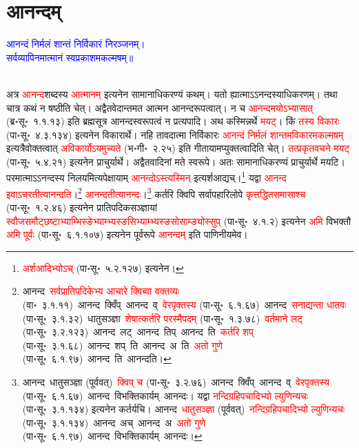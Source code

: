 \section[आनन्दम्]{आनन्दम्}
\centering\textcolor{blue}{आनन्दं निर्मलं शान्तं निर्विकारं निरञ्जनम्।\nopagebreak\\
सर्वव्यापिनमात्मानं स्वप्रकाशमकल्मषम्॥}\nopagebreak\\
\\
\begin{sloppypar}\justifying\noindent\hspace{10mm} अत्र \textcolor{red}{आनन्द}\-शब्दस्य \textcolor{red}{आत्मानम्} इत्यनेन सामानाधिकरण्यं कथम्। यतो ह्यात्माऽऽनन्दस्याधिकरणम्। तथा चात्र कथं न षष्ठीति चेत्। अद्वैत\-वेदान्त\-मत आत्मन आनन्द\-रूपत्वात्। न च \textcolor{red}{आनन्दमयोऽभ्यासात्} (ब्र॰सू॰~१.१.१३) इति ब्रह्मसूत्र आनन्द\-स्वरूपत्वं न प्रत्यपादि। अथ कस्मिन्नर्थे \textcolor{red}{मयट्}। किं \textcolor{red}{तस्य विकारः} (पा॰सू॰~४.३.१३४) इत्यनेन विकारार्थे। नहि तावदात्मा निर्विकारः \textcolor{red}{आनन्दं निर्मलं शान्तमविकारमकल्मषम्} इत्यत्रैवोक्तत्वात् \textcolor{red}{अविकार्योऽयमुच्यते} (भ॰गी॰~२.२५) इति गीतायामप्युक्तत्वादिति चेत्। \textcolor{red}{तत्प्रकृत\-वचने मयट्} (पा॰सू॰~५.४.२१) इत्यनेन प्राचुर्यार्थे। अद्वैतवादिनां मते स्वरूपे। अतः सामानाधिकरण्यं प्राचुर्यार्थे मयटि। परमात्माऽऽनन्दस्य निलयमित्यपेक्षायाम् \textcolor{red}{आनन्दोऽस्त्यस्मिन्} इत्यर्श\-आद्यच्।\footnote{\textcolor{red}{अर्शआदिभ्योऽच्} (पा॰सू॰~५.२.१२७) इत्यनेन।} यद्वा \textcolor{red}{आनन्द इवाऽचरतीत्यानन्दति}।\footnote{आनन्द~\arrow \textcolor{red}{सर्वप्राति\-पदिकेभ्य आचारे क्विब्वा वक्तव्यः} (वा॰~३.१.११)~\arrow आनन्द~क्विँप्~\arrow आनन्द~व्~\arrow \textcolor{red}{वेरपृक्तस्य} (पा॰सू॰~६.१.६७)~\arrow आनन्द~\arrow \textcolor{red}{सनाद्यन्ता धातवः} (पा॰सू॰~३.१.३२)~\arrow धातुसञ्ज्ञा~\arrow \textcolor{red}{शेषात्कर्तरि परस्मैपदम्} (पा॰सू॰~१.३.७८)~\arrow \textcolor{red}{वर्तमाने लट्} (पा॰सू॰~३.२.१२३)~\arrow आनन्द~लट्~\arrow आनन्द~तिप्~\arrow आनन्द~ति~\arrow \textcolor{red}{कर्तरि शप्‌} (पा॰सू॰~३.१.६८)~\arrow आनन्द~शप्~ति~\arrow आनन्द~अ~ति~\arrow \textcolor{red}{अतो गुणे} (पा॰सू॰~६.१.९७)~\arrow आनन्द~ति~\arrow आनन्दति।} \textcolor{red}{आनन्दतीत्यानन्दः}।\footnote{आनन्द~\arrow धातुसञ्ज्ञा (पूर्ववत्)~\arrow \textcolor{red}{क्विप् च} (पा॰सू॰~३.२.७६)~\arrow आनन्द~क्विँप्~\arrow आनन्द~व्~\arrow \textcolor{red}{वेरपृक्तस्य} (पा॰सू॰~६.१.६७)~\arrow आनन्द~\arrow विभक्तिकार्यम्~\arrow आनन्दः। यद्वा \textcolor{red}{नन्दि\-ग्रहि\-पचादिभ्यो ल्युणिन्यचः} (पा॰सू॰~३.१.१३४) इत्यनेन कर्तर्यचि। आनन्द~\arrow \textcolor{red}{धातुसञ्ज्ञा} (पूर्ववत्)~\arrow \textcolor{red}{नन्दि\-ग्रहि\-पचादिभ्यो ल्युणिन्यचः} (पा॰सू॰~३.१.१३४)~\arrow आनन्द~अच्~\arrow आनन्द~अ~\arrow \textcolor{red}{अतो गुणे} (पा॰सू॰~६.१.९७)~\arrow आनन्द~\arrow विभक्तिकार्यम्~\arrow आनन्दः।} कर्तरि क्विपि सर्वापहारि\-लोपे \textcolor{red}{कृत्तद्धित\-समासाश्च} (पा॰सू॰~१.२.४६) इत्यनेन प्रातिपदिक\-सञ्ज्ञायां \textcolor{red}{स्वौ\-जसमौट्छष्टा\-भ्याम्भिस्ङे\-भ्याम्भ्यस्ङसि\-भ्याम्भ्यस्ङसोसाम्ङ्योस्सुप्} (पा॰सू॰~४.१.२) इत्यनेन \textcolor{red}{अमि} विभक्तौ \textcolor{red}{अमि पूर्वः} (पा॰सू॰~६.१.१०७) इत्यनेन पूर्व\-रूपे \textcolor{red}{आनन्दम्} इति पाणिनीयमेव।\end{sloppypar}
